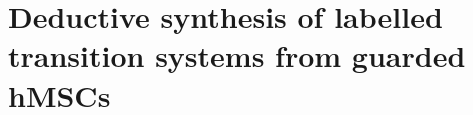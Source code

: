 \chapter{Deductive synthesis of labelled transition systems from guarded hMSCs}
\label{chap:deductive}
